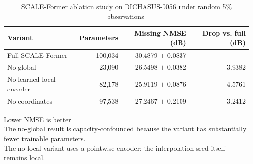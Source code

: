 \begin{table}[t]
\centering
\caption{SCALE-Former ablation study on DICHASUS-0056 under random 5\% observations.}
\label{tab:ablation}
\begin{tabular}{lrrr}
\hline
Variant & Parameters & Missing NMSE (dB) & Drop vs. full (dB) \\
\hline
Full SCALE-Former & 100,034 & -30.4879 $\pm$ 0.0837 & -- \\
No global & 23,090 & -26.5498 $\pm$ 0.0382 & 3.9382 \\
No learned local encoder & 82,178 & -25.9119 $\pm$ 0.0876 & 4.5761 \\
No coordinates & 97,538 & -27.2467 $\pm$ 0.2109 & 3.2412 \\
\hline
\end{tabular}
\vspace{1mm}
\begin{minipage}{0.98\textwidth}
\footnotesize
Lower NMSE is better.\\
The no-global result is capacity-confounded because the variant has substantially fewer trainable parameters.\\
The no-local variant uses a pointwise encoder; the interpolation seed itself remains local.\\
\end{minipage}
\end{table}
